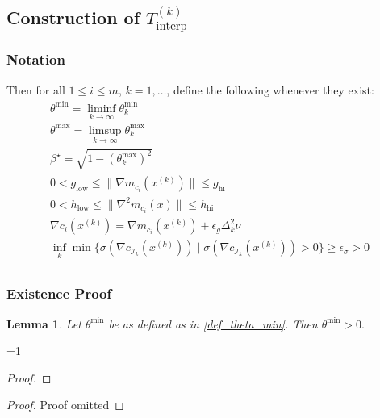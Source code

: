 \documentclass{article}
\newenvironment{comment}
  {\par\medskip
   \color{red}%
   \begin{framed}
   \textbf{Comment: }\ignorespaces}
 {\end{framed}
  \medskip}
\newtheorem{lemma}[theorem]{Lemma}
\theoremstyle{case}
\newcommand{\xk}{{x^{(k)}}}
\newcommand{\dk}{\Delta_k}
\newcommand{\sampletrk}{{T_{\text{interp}}^{(k)}}}
\newcommand{\bs}{{\beta^{\star}}}
\newcommand{\gmcik}{{\nabla m_{c_i}(\xk)}}
\def\includeproofs{1}
\begin{document}
\subsection{Construction of $\sampletrk$}
\label{feasible_ellipsoid_analysis}

\subsubsection{Notation}
Then for all $1 \le i \le m$, $k = 1, \ldots$, define the following whenever they exist:
\begin{align}
\theta^{\text{min}} = \liminf_{k\to\infty} \theta^{\text{min}}_k \label{def_theta_min} \\
\theta^{\text{max}} = \limsup_{k\to\infty} \theta^{\text{max}}_k \label{def_theta_max} \\
\bs = \sqrt{ 1 - (\theta^{\text{max}}_k)^2} \label{def_bs} \\
0 < g_{\text{low}} \le \|\gmcik\| \le g_{\text{hi}} \label{def_g_bounds} \\
0 < h_{\text{low}} \le \|\nabla^2m_{c_i}(x)\| \le h_{\text{hi}} \label{def_h_bounds} \\
\nabla c_i(\xk) = \nabla m_{c_i}(\xk) + \epsilon_{g}\dk^2\nu \label{def_lambda_poised} \\
\inf_{k}\min\{\sigma(\nabla c_{\mathcal I_k}(\xk)) \; | \; \sigma(\nabla c_{\mathcal I_k}(\xk)) > 0 \} \ge \epsilon_{\sigma} > 0\\
\end{align}


\subsubsection{Existence Proof}

\begin{lemma}
Let $\theta^{\text{min}}$ be as defined as in \cref{def_theta_min}.
Then $\theta^{\text{min}} > 0.$
\end{lemma}

\ifnum\includeproofs=1
\begin{proof}


\end{proof}
\else
\begin{proof}
Proof omitted
\end{proof}
\fi
\end{document}
